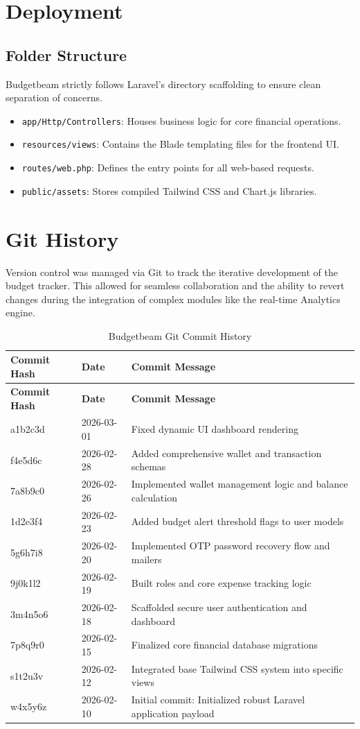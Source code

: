 \chapter{Deployment}
\section{Folder Structure}
Budgetbeam strictly follows Laravel's directory scaffolding to ensure clean separation of concerns.
\begin{itemize}
    \item \texttt{app/Http/Controllers}: Houses business logic for core financial operations.
    \item \texttt{resources/views}: Contains the Blade templating files for the frontend UI.
    \item \texttt{routes/web.php}: Defines the entry points for all web-based requests.
    \item \texttt{public/assets}: Stores compiled Tailwind CSS and Chart.js libraries.
\end{itemize}

\chapter{Git History}
Version control was managed via Git to track the iterative development of the budget tracker. This allowed for seamless collaboration and the ability to revert changes during the integration of complex modules like the real-time Analytics engine.

\begin{longtable}{|l|l|p{8cm}|}
\caption{Budgetbeam Git Commit History} \\
\hline
\textbf{Commit Hash} & \textbf{Date} & \textbf{Commit Message} \\ \hline
\endfirsthead
\hline
\textbf{Commit Hash} & \textbf{Date} & \textbf{Commit Message} \\ \hline
\endhead
a1b2c3d & 2026-03-01 & Fixed dynamic UI dashboard rendering \\ \hline
f4e5d6c & 2026-02-28 & Added comprehensive wallet and transaction schemas \\ \hline
7a8b9c0 & 2026-02-26 & Implemented wallet management logic and balance calculation \\ \hline
1d2e3f4 & 2026-02-23 & Added budget alert threshold flags to user models \\ \hline
5g6h7i8 & 2026-02-20 & Implemented OTP password recovery flow and mailers \\ \hline
9j0k1l2 & 2026-02-19 & Built roles and core expense tracking logic \\ \hline
3m4n5o6 & 2026-02-18 & Scaffolded secure user authentication and dashboard \\ \hline
7p8q9r0 & 2026-02-15 & Finalized core financial database migrations \\ \hline
s1t2u3v & 2026-02-12 & Integrated base Tailwind CSS system into specific views \\ \hline
w4x5y6z & 2026-02-10 & Initial commit: Initialized robust Laravel application payload \\ \hline
\end{longtable}

